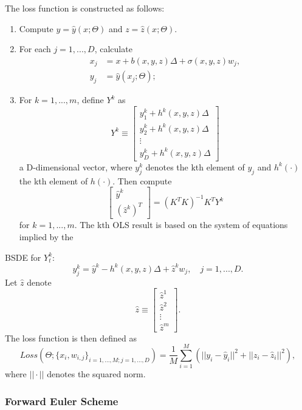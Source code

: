 \documentclass{article}
\begin{document}
The loss function is constructed as follows:
\begin{enumerate}[label=\arabic*.]
    \item Compute $y=\hat{y}(x;\Theta)$ and $z=\hat{z}(x;\Theta)$.
    \item For each $j=1,...,D$, calculate
    \begin{align*}
    x_{j}&=x+b(x,y,z)\Delta+\sigma(x,y,z)w_{j}, \\
    y_{j}&=\hat{y}(x_{j};\Theta);
    \end{align*}
    \item For $k=1,...,m$, define $Y^{k}$ as
    \[
    Y^{k}\equiv\begin{bmatrix}y_{1}^{k}+h^{k}(x,y,z)\Delta\\ y_{2}^{k}+h^{k}(x,y,z)\Delta\\ \vdots\\ y_{D}^{k}+h^{k}(x,y,z)\Delta\end{bmatrix}
    \]
    a D-dimensional vector, where $y_{j}^{k}$ denotes the kth element of $y_{j}$ and $h^{k}(\cdot)$ the kth element of $h(\cdot)$. Then compute
    \[
    \begin{bmatrix}\hat{y}^{k}\\ (\hat{z}^{k})^{T}\end{bmatrix}=(K^{T}K)^{-1}K^{T}Y^{k}
    \]
    for $k=1,...,m$. The kth OLS result is based on the system of equations implied by the
\end{enumerate}

\clearpage

BSDE for $Y_{t}^{k}$:
\[
y_{j}^{k}=\hat{y}^{k}-h^{k}(x,y,z)\Delta+\hat{z}^{k}w_{j}, \quad j=1,...,D.
\]
Let $\hat{z}$ denote
\[
\hat{z}\equiv\begin{bmatrix}\hat{z}^{1}\\ \hat{z}^{2}\\ \vdots\\ \hat{z}^{m}\end{bmatrix}.
\]
The loss function is then defined as
\[
Loss(\Theta;\{x_{i},w_{i,j}\}_{i=1,...,M;j=1,...,D})=\frac{1}{M}\sum_{i=1}^{M}(||y_{i}-\hat{y}_{i}||^{2}+||z_{i}-\hat{z}_{i}||^{2}),
\]
where $||\cdot||$ denotes the squared norm.

\subsubsection{Forward Euler Scheme}
\end{document}
